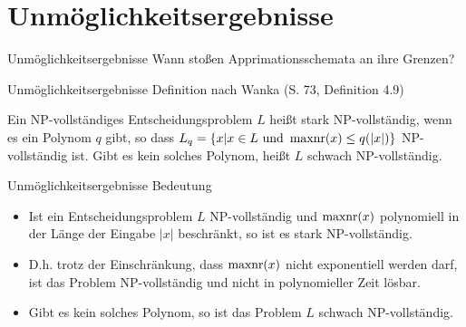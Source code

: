 \section{Unmöglichkeitsergebnisse}

\begin{frame}{Unmöglichkeitsergebnisse}
	 Wann stoßen Apprimationsschemata an ihre Grenzen?   
\end{frame}

\begin{frame}{Unmöglichkeitsergebnisse}
	Definition nach Wanka (S. 73, Definition 4.9) \newline
	
	Ein NP-vollständiges Entscheidungsproblem $L$ heißt stark NP-vollständig,  wenn es ein Polynom $q$ gibt, so dass $L_q = \{x\vert x \in L \text{ und } \operatorname{maxnr}(x) \leq q(\vert x \vert)\}$ NP-vollständig  ist. Gibt es kein solches Polynom, heißt $L$ schwach  NP-vollständig.
\end{frame}

\begin{frame}{Unmöglichkeitsergebnisse}
	Bedeutung
	\begin{itemize}
		\item Ist ein Entscheidungsproblem $L$ NP-vollständig und $\operatorname{maxnr}(x)$ polynomiell in der Länge der Eingabe $\vert x \vert$ beschränkt, so ist es stark NP-vollständig.
		\item D.h. trotz der Einschränkung, dass $\operatorname{maxnr}(x)$ nicht exponentiell werden darf, ist das Problem NP-vollständig und nicht in polynomieller Zeit lösbar.
		\item Gibt es kein solches Polynom, so ist das Problem $L$ schwach NP-vollständig.
	\end{itemize}
\end{frame}

